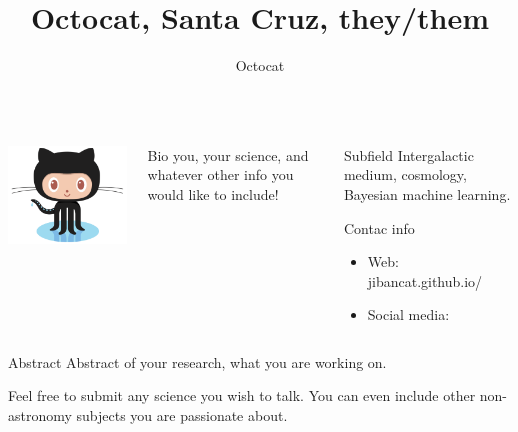 \documentclass{beamer}
\author[Octocat@ucsc.edu]{Octocat}
\title{Octocat, Santa Cruz, they/them}
\institute{UC Santa Cruz}
\begin{document}
\begin{frame}[fragile]
  \begin{columns}[T]

    \begin{column}{.33\textwidth}
      
      \begin{block}{}
        \begin{center}
          \includegraphics[width=8cm]{images/Octocat.png}
        \end{center}
      \end{block}
    \end{column}

    \begin{column}{.40\textwidth}

      \begin{block}{Bio}
        you, your science, and whatever other info you would like to include!
      \end{block}
    \end{column}

    \begin{column}{.20\textwidth}
      \begin{block}{Subfield}
        Intergalactic medium, cosmology, Bayesian machine learning.
      \end{block}
      \begin{block}{Contac info}    
        \begin{itemize}
          \item Web: jibancat.github.io/
          \item Social media:
        \end{itemize}
      \end{block}
  
  \end{column}

  \end{columns}

  \begin{block}{Abstract}
    Abstract of your research, what you are working on.

    Feel free to submit any science you wish to talk. You can even include other non-astronomy subjects you are passionate about.
  \end{block}


\end{frame}
\end{document}
